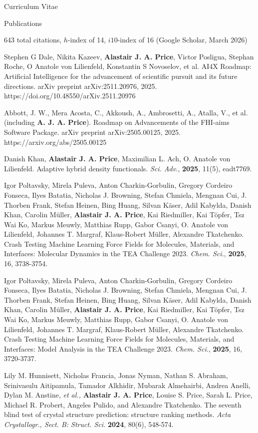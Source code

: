 \documentclass[a4paper,oneside,11pt]{article}
\begin{document}
\begin{cv}{Curriculum Vitae}
\begin{cvlist}{Publications}
\item[] 643 total citations, $h$-index of 14, $i10$-index of 16 (Google Scholar,  March 2026)
         \item[18.] Stephen G Dale, Nikita Kazeev, \textbf{Alastair J. A. Price}, Victor Posligua, Stephan Roche, O Anatole von Lilienfeld, Konstantin S Novoselov, et al. AI4X Roadmap: Artificial Intelligence for the advancement of scientific pursuit and its future directions. arXiv preprint arXiv:2511.20976, 2025. https://doi.org/10.48550/arXiv.2511.20976 
          \item[17.] Abbott, J. W., Mera Acosta, C., Akkoush, A., Ambrosetti, A., Atalla, V., et al. (including {\bf{A. J. A. Price}}). Roadmap on Advancements of the FHI-aims Software Package. arXiv preprint arXiv:2505.00125, 2025.
https://arxiv.org/abs/2505.00125
          \item[16.] Danish Khan, \textbf{Alastair J. A. Price}, Maximilian L. Ach, O. Anatole von Lilienfeld. Adaptive hybrid density functionals. {\it Sci. Adv.}, \textbf{2025}, 11(5), eadt7769.
          \item[15.] Igor Poltavsky, Mirela Puleva, Anton Charkin-Gorbulin, Gregory Cordeiro Fonseca, Ilyes Batatia, Nicholas J. Browning, Stefan Chmiela, Mengnan Cui, J. Thorben Frank, Stefan Heinen, Bing Huang, Silvan Käser, Adil Kabylda, Danish Khan, Carolin Müller, {\bf Alastair J. A. Price}, Kai Riedmiller, Kai Töpfer, Tsz Wai Ko, Markus Meuwly, Matthias Rupp, Gabor Csanyi, O. Anatole von Lilienfeld, Johannes T. Margraf, Klaus-Robert Müller, Alexandre Tkatchenko. Crash Testing Machine Learning Force Fields for Molecules, Materials, and Interfaces: Molecular Dynamics in the TEA Challenge 2023. {\it Chem. Sci.}, \textbf{2025}, 16, 3738-3754.
          \item[14.] Igor Poltavsky, Mirela Puleva, Anton Charkin-Gorbulin, Gregory Cordeiro Fonseca, Ilyes Batatia, Nicholas J. Browning, Stefan Chmiela, Mengnan Cui, J. Thorben Frank, Stefan Heinen, Bing Huang, Silvan Käser, Adil Kabylda, Danish Khan, Carolin Müller, {\bf Alastair J. A. Price}, Kai Riedmiller, Kai Töpfer, Tsz Wai Ko, Markus Meuwly, Matthias Rupp, Gabor Csanyi, O. Anatole von Lilienfeld, Johannes T. Margraf, Klaus-Robert Müller, Alexandre Tkatchenko. Crash Testing Machine Learning Force Fields for Molecules, Materials, and Interfaces: Model Analysis in the TEA Challenge 2023. {\it Chem. Sci.}, \textbf{2025}, 16, 3720-3737.
          \item[13.] Lily M. Hunnisett, Nicholas Francia, Jonas Nyman, Nathan S. Abraham, Srinivasulu Aitipamula, Tamador Alkhidir, Mubarak Almehairbi, Andrea Anelli, Dylan M. Anstine, {\it et al.,} {\bf Alastair J. A. Price}, Louise S. Price, Sarah L. Price, Michael R. Probert, Angeles Pulido, and Alexandre Tkatchenko. The seventh blind test of crystal structure prediction: structure ranking methods. {\it Acta Crystallogr., Sect. B: Struct. Sci.} {\bf 2024}, 80(6), 548-574.

\end{cvlist}
\end{cv}
\end{document}
